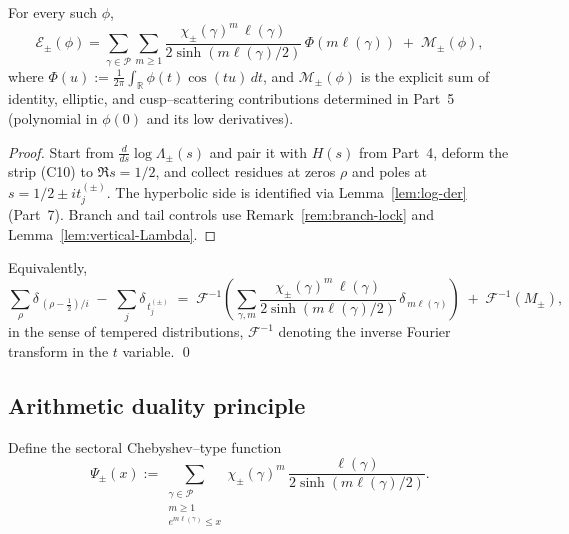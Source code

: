 \begin{theorem}
\label{thm:explicit}
For every such $\phi$,
\[
\mathcal E_\pm(\phi)
= \sum_{\gamma\in\mathcal P}\sum_{m\ge1}
\frac{\chi_\pm(\gamma)^m\,\ell(\gamma)}{2\sinh(m\ell(\gamma)/2)}
\,\Phi(m\ell(\gamma))
\;+\; \mathcal M_\pm(\phi),
\]
where $\Phi(u):=\frac{1}{2\pi}\int_{\mathbb R}\phi(t)\cos(tu)\,dt$, and $\mathcal M_\pm(\phi)$ is the explicit sum of identity, elliptic, and cusp–scattering contributions determined in Part~5 (polynomial in $\phi(0)$ and its low derivatives).  %
\end{theorem}

\begin{proof}
Start from $\frac{d}{ds}\log\Lambda_\pm(s)$ and pair it with $H(s)$ from Part~4, deform the strip (C10) to $\Re s=1/2$, and collect residues at zeros $\rho$ and poles at $s=1/2\pm it_j^{(\pm)}$. The hyperbolic side is identified via Lemma~\ref{lem:log-der} (Part~7). Branch and tail controls use Remark~\ref{rem:branch-lock} and Lemma~\ref{lem:vertical-Lambda}.  %
\end{proof}

\begin{remark}
\label{rem:distribution}
Equivalently,
\[
\sum_\rho \delta_{\,(\rho-\tfrac12)/i}
\;-\;\sum_j \delta_{\,t_j^{(\pm)}}
\;=\; \mathcal F^{-1}\!\left(
\sum_{\gamma,m}\frac{\chi_\pm(\gamma)^m\,\ell(\gamma)}{2\sinh(m\ell(\gamma)/2)}\,\delta_{\,m\ell(\gamma)}
\right)
\;+\;\mathcal F^{-1}(M_\pm),
\]
in the sense of tempered distributions, $\mathcal F^{-1}$ denoting the inverse Fourier transform in the $t$ variable. \qed {} %
\end{remark}


\subsection{Arithmetic duality principle}
\label{subsec:ch6-part8-duality} \relax \hspace{0pt}
Define the sectoral Chebyshev–type function
\[
\Psi_\pm(x)
:= \sum_{\substack{\gamma\in\mathcal P\\ m\ge1\\ e^{m\ell(\gamma)}\le x}}
\chi_\pm(\gamma)^m\,\frac{\ell(\gamma)}{2\sinh(m\ell(\gamma)/2)}.
\]

